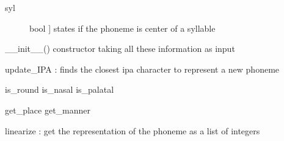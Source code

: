 \documentclass[letterpaper,10pt,english]{sphinxmanual}
\begin{document}
\begin{fulllineitems}
\begin{description}
\item[{syl}] \leavevmode{[}bool {]}
\sphinxAtStartPar
states if the phoneme is center of a syllable

\end{description}

\sphinxAtStartPar
\_\_init\_\_() constructor taking all these information as input

\sphinxAtStartPar
update\_IPA  : finds the closest ipa character to represent a new phoneme

\sphinxAtStartPar
is\_round
is\_nasal
is\_palatal

\sphinxAtStartPar
get\_place
get\_manner

\sphinxAtStartPar
linearize : get the representation of the phoneme as a list of integers

\end{fulllineitems}

\end{document}
